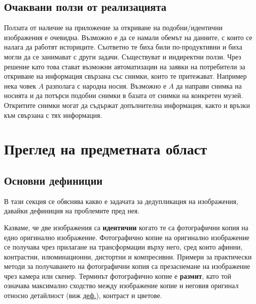 \documentclass[a4paper,12pt]{article}
\begin{document}
\subsection{Очаквани ползи от реализацията}

Ползата от наличие на приложение за откриване на подобни/идентични изображения е очевидна. Възможно е да се намали обемът на данните, с които се налага да работят историците. Съответно те биха били по-продуктивни и биха могли да се занимават с други задачи. Съществуват и индиректни ползи. Чрез решение като това стават възможни автоматизации на заявки на потребители за откриване на информация свързана със снимки, които те притежават. Например нека човек $A$ разполага с народна носия. Възможно е $A$ да направи снимка на носията и да потърси подобни снимки в базата от снимки на конкретен музей. Откритите снимки могат да съдържат допълнителна информация, както и връзки към свързана с тях информация.

\section{Преглед на предметната област}

\subsection{Основни дефиниции}

В тази секция се обяснява какво е задачата за дедупликация на изображения, давайки дефиниция на проблемите пред нея.

\bigbreak

Казваме, че две изображения са \textbf{идентични} когато те са фотографични копия на едно оригинално изображение. Фотографично копие на оригинално изображение се получава чрез прилагане на трансформации върху него, сред които афинни, контрастни, илюминационни, дистортни и компресивни. Примери за практически методи за получаването на фотографични копия са презаснемане на изображение чрез камера или скенер. Терминът фотографично копие е \textbf{размит}, като той означава максимално сходство между изображение копие и неговия оригинал относно детайлност (виж \hyperref[def:imdetail]{деф.}), контраст и цветове.
\end{document}
